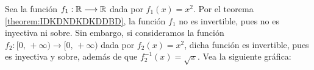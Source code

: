 \begin{myexample}
    Sea la función $f_1: \RR \longrightarrow \RR$ dada por $f_1(x) = x^2$. Por el teorema \ref{theorem:IDKDNDKDKDDBD}, la función $f_1$ no es invertible, pues no es inyectiva ni sobre. Sin embargo, si consideramos la función $f_2:[0, \, + \infty) \longrightarrow [0, \, +\infty)$ dada por $f_2(x) = x^2$, dicha función es invertible, pues es inyectiva y sobre, además de que $f_2^{-1}(x) = \sqrt{x}$. Vea la siguiente gráfica:
    \begin{center}
        \label{JAJSJJSJSJUJYBBNKOIJD}
    \end{center}
\end{myexample}

\newpage

